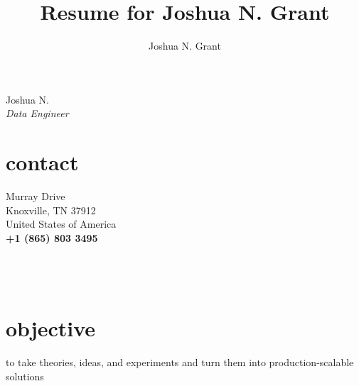 \documentclass[10pt]{article}
\author{Joshua N. Grant}
\title{Resume for Joshua N. Grant}%
\begin{document}
\begin{minipage}[ht]{.3\linewidth} %
  \setlength{\headsep}{-10pt} %
  \setlength{\voffset}{-0.75in} %
  {\Large Joshua N. \LARGE{}} \\
  {\large \textit{Data Engineer}}
  \section*{\faUser{} contact}%
     Murray Drive \\
    Knoxville, TN 37912 \\
    United States of America \\
    \textbf{+1 (865) 803 3495} \faMobile\\
    \href{mailto:jngrant@live.com}{\color{\linkcolor}{%
      jngrant@live.com \faEnvelope}} \\
    \href{https://notjustadatum.blogspot.com}{\color{linkcolor}{%
      notjustadatum.blogspot.com \faBold}} \\
    \href{https://github.com/sempervent}{\color{linkcolor}{%
      github.com/sempervent \faGithubAlt}} \\
    \href{https://www.linkedin.com/in/joshua-grant-a3842968/}{}
  \section*{\faBullseye{} objective}%
    \flushright{} to take theories, ideas, and experiments and turn them into %
    production-scalable solutions \flushleft%

\end{minipage}
\end{document}
